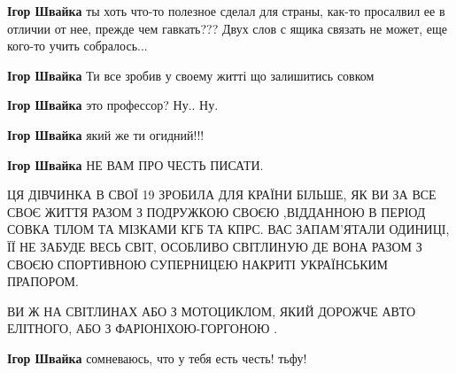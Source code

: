 \begin{itemize}
\begin{itemize}
\textbf{Ігор Швайка} ты хоть что-то полезное сделал для страны, как-то
просалвил ее в отличии от нее, прежде чем гавкать??? Двух слов с ящика связать
не может, еще кого-то учить собралось...

 
\textbf{Ігор Швайка} Ти все зробив у своему житті що залишитись совком

 
\textbf{Ігор Швайка} это профессор? Ну.. Ну.

 
\textbf{Ігор Швайка} який же ти огидний!!!

 
\textbf{Ігор Швайка} НЕ ВАМ ПРО ЧЕСТЬ ПИСАТИ.

ЦЯ ДІВЧИНКА В СВОЇ 19 ЗРОБИЛА ДЛЯ КРАЇНИ БІЛЬШЕ, ЯК ВИ ЗА ВСЕ СВОЄ ЖИТТЯ РАЗОМ З
ПОДРУЖКОЮ СВОЄЮ ,ВІДДАННОЮ В ПЕРІОД СОВКА ТІЛОМ ТА МІЗКАМИ КГБ ТА КПРС. ВАС
ЗАПАМ'ЯТАЛИ ОДИНИЦІ, ЇЇ НЕ ЗАБУДЕ ВЕСЬ СВІТ, ОСОБЛИВО СВІТЛИНУЮ ДЕ ВОНА РАЗОМ З
СВОЄЮ СПОРТИВНОЮ СУПЕРНИЦЕЮ НАКРИТІ УКРАЇНСЬКИМ ПРАПОРОМ.

ВИ Ж НА СВІТЛИНАХ АБО З МОТОЦИКЛОМ, ЯКИЙ ДОРОЖЧЕ АВТО ЕЛІТНОГО, АБО З ФАРІОНІХОЮ-ГОРГОНОЮ .


 
\textbf{Ігор Швайка} сомневаюсь, что у тебя есть честь! тьфу!


\end{itemize}
\end{itemize}
